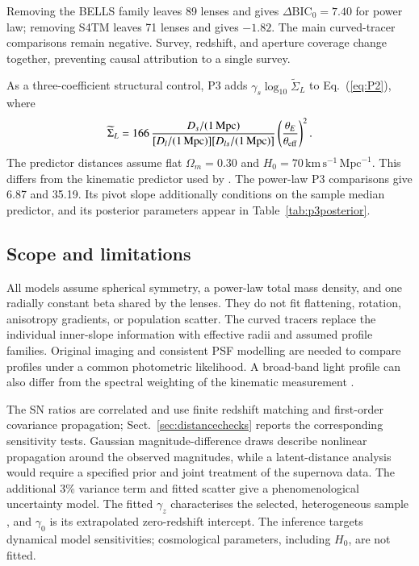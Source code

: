 \documentclass{aa}
\newcommand{\kms}{\ensuremath{\mathrm{km\,s^{-1}}}}
\begin{document}
Removing the BELLS family leaves 89 lenses and gives $\Delta\mathrm{BIC}_0=7.40$ for power law; removing S4TM leaves 71 lenses and gives $-1.82$. The main curved-tracer comparisons remain negative. Survey, redshift, and aperture coverage change together, preventing causal attribution to a single survey.

As a three-coefficient structural control, P3 adds $\gamma_s\log_{10}\widetilde\Sigma_L$ to Eq.~(\ref{eq:P2}), where
\begin{equation}
\widetilde\Sigma_L=166\,\frac{D_s/(1\,\mathrm{Mpc})}{[D_l/(1\,\mathrm{Mpc})][D_{ls}/(1\,\mathrm{Mpc})]}
\left(\frac{\theta_E}{\theta_{\rm eff}}\right)^2.
\end{equation}
The predictor distances assume flat $\Omega_m=0.30$ and $H_0=70\,\kms\,\mathrm{Mpc}^{-1}$. This differs from the kinematic predictor used by \citet{stz1902}. The power-law P3 comparisons give 6.87 and 35.19. Its pivot slope additionally conditions on the sample median predictor, and its posterior parameters appear in Table~\ref{tab:p3posterior}.
\subsection{Scope and limitations}\label{sec:limitations}
All models assume spherical symmetry, a power-law total mass density, and one radially constant beta shared by the lenses. They do not fit flattening, rotation, anisotropy gradients, or population scatter. The curved tracers replace the individual inner-slope information with effective radii and assumed profile families. Original imaging and consistent PSF modelling are needed to compare profiles under a common photometric likelihood. A broad-band light profile can also differ from the spectral weighting of the kinematic measurement \citep{Fores2026}.

The SN ratios are correlated and use finite redshift matching and first-order covariance propagation; Sect.~\ref{sec:distancechecks} reports the corresponding sensitivity tests. Gaussian magnitude-difference draws describe nonlinear propagation around the observed magnitudes, while a latent-distance analysis would require a specified prior and joint treatment of the supernova data. The additional 3\% variance term and fitted scatter give a phenomenological uncertainty model. The fitted $\gamma_z$ characterises the selected, heterogeneous sample \citep{Bolton2012,Sonnenfeld2013,stz1902}, and $\gamma_0$ is its extrapolated zero-redshift intercept. The inference targets dynamical model sensitivities; cosmological parameters, including $H_0$, are not fitted.
\end{document}

